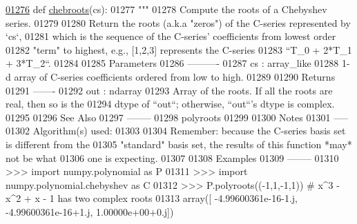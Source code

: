\begin{DoxyCode}
\hypertarget{namespacepyneb_1_1utils_1_1chebyshev_l01276}{}\hyperlink{namespacepyneb_1_1utils_1_1chebyshev_a2f01a14e36b415a2f3ebc67c95cceb26}{01276} \textcolor{keyword}{def }\hyperlink{namespacepyneb_1_1utils_1_1chebyshev_a2f01a14e36b415a2f3ebc67c95cceb26}{chebroots}(cs):
01277     \textcolor{stringliteral}{"""}
01278 \textcolor{stringliteral}{    Compute the roots of a Chebyshev series.}
01279 \textcolor{stringliteral}{}
01280 \textcolor{stringliteral}{    Return the roots (a.k.a "zeros") of the C-series represented by `cs`,}
01281 \textcolor{stringliteral}{    which is the sequence of the C-series' coefficients from lowest order}
01282 \textcolor{stringliteral}{    "term" to highest, e.g., [1,2,3] represents the C-series}
01283 \textcolor{stringliteral}{    ``T\_0 + 2*T\_1 + 3*T\_2``.}
01284 \textcolor{stringliteral}{}
01285 \textcolor{stringliteral}{    Parameters}
01286 \textcolor{stringliteral}{    ----------}
01287 \textcolor{stringliteral}{    cs : array\_like}
01288 \textcolor{stringliteral}{        1-d array of C-series coefficients ordered from low to high.}
01289 \textcolor{stringliteral}{}
01290 \textcolor{stringliteral}{    Returns}
01291 \textcolor{stringliteral}{    -------}
01292 \textcolor{stringliteral}{    out : ndarray}
01293 \textcolor{stringliteral}{        Array of the roots.  If all the roots are real, then so is the}
01294 \textcolor{stringliteral}{        dtype of ``out``; otherwise, ``out``'s dtype is complex.}
01295 \textcolor{stringliteral}{}
01296 \textcolor{stringliteral}{    See Also}
01297 \textcolor{stringliteral}{    --------}
01298 \textcolor{stringliteral}{    polyroots}
01299 \textcolor{stringliteral}{}
01300 \textcolor{stringliteral}{    Notes}
01301 \textcolor{stringliteral}{    -----}
01302 \textcolor{stringliteral}{    Algorithm(s) used:}
01303 \textcolor{stringliteral}{}
01304 \textcolor{stringliteral}{    Remember: because the C-series basis set is different from the}
01305 \textcolor{stringliteral}{    "standard" basis set, the results of this function *may* not be what}
01306 \textcolor{stringliteral}{    one is expecting.}
01307 \textcolor{stringliteral}{}
01308 \textcolor{stringliteral}{    Examples}
01309 \textcolor{stringliteral}{    --------}
01310 \textcolor{stringliteral}{    >>> import numpy.polynomial as P}
01311 \textcolor{stringliteral}{    >>> import numpy.polynomial.chebyshev as C}
01312 \textcolor{stringliteral}{    >>> P.polyroots((-1,1,-1,1)) # x^3 - x^2 + x - 1 has two complex roots}
01313 \textcolor{stringliteral}{    array([ -4.99600361e-16-1.j,  -4.99600361e-16+1.j,   1.00000e+00+0.j])}

\end{DoxyCode}
